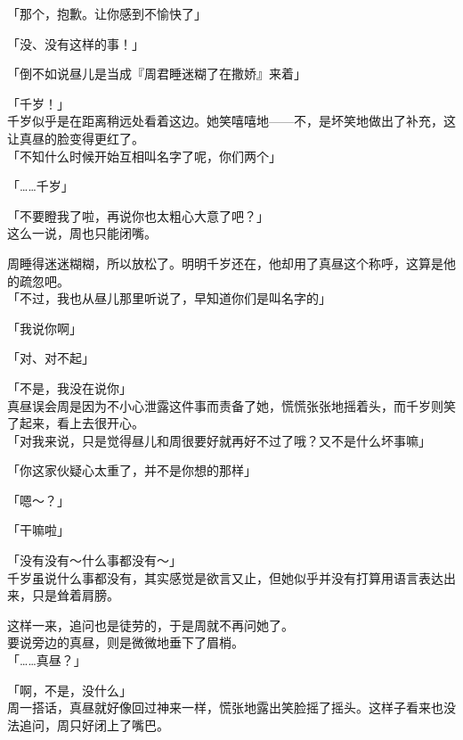 「那个，抱歉。让你感到不愉快了」

「没、没有这样的事！」

「倒不如说昼儿是当成『周君睡迷糊了在撒娇』来着」

「千岁！」\\

千岁似乎是在距离稍远处看着这边。她笑嘻嘻地——不，是坏笑地做出了补充，这让真昼的脸变得更红了。\\

「不知什么时候开始互相叫名字了呢，你们两个」

「……千岁」

「不要瞪我了啦，再说你也太粗心大意了吧？」\\

这么一说，周也只能闭嘴。

周睡得迷迷糊糊，所以放松了。明明千岁还在，他却用了真昼这个称呼，这算是他的疏忽吧。\\

「不过，我也从昼儿那里听说了，早知道你们是叫名字的」

「我说你啊」

「对、对不起」

「不是，我没在说你」\\

真昼误会周是因为不小心泄露这件事而责备了她，慌慌张张地摇着头，而千岁则笑了起来，看上去很开心。\\

「对我来说，只是觉得昼儿和周很要好就再好不过了哦？又不是什么坏事嘛」

「你这家伙疑心太重了，并不是你想的那样」

「嗯～？」

「干嘛啦」

「没有没有～什么事都没有～」\\

千岁虽说什么事都没有，其实感觉是欲言又止，但她似乎并没有打算用语言表达出来，只是耸着肩膀。

这样一来，追问也是徒劳的，于是周就不再问她了。\\

要说旁边的真昼，则是微微地垂下了眉梢。\\

「……真昼？」

「啊，不是，没什么」\\

周一搭话，真昼就好像回过神来一样，慌张地露出笑脸摇了摇头。这样子看来也没法追问，周只好闭上了嘴巴。\\

